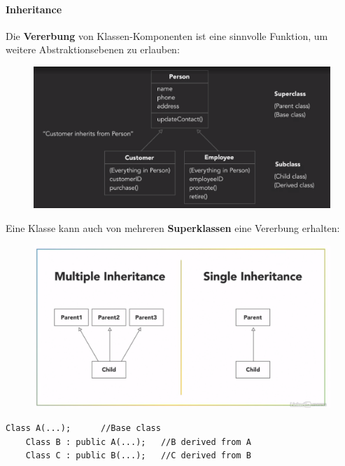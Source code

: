 \paragraph{Inheritance}
Die \textbf{Vererbung} von Klassen-Komponenten ist eine sinnvolle Funktion, um weitere Abstraktionsebenen zu erlauben:
\begin{figure}[H]
	\centering
	\includegraphics[scale = 0.3]{attachment/chapter_2/Scc010}
	\caption{}
	\label{fig:Scc010}
\end{figure}

Eine Klasse kann auch von mehreren \textbf{Superklassen} eine Vererbung erhalten:
\begin{figure}[H]
	\centering
	\includegraphics[scale = 0.2]{attachment/chapter_2/Scc011}
	\caption{}
	\label{fig:Scc011}
\end{figure}
\begin{lstlisting}[style=C++]
	Class A(...);      //Base class
	Class B : public A(...);   //B derived from A
	Class C : public B(...);   //C derived from B
\end{lstlisting}

